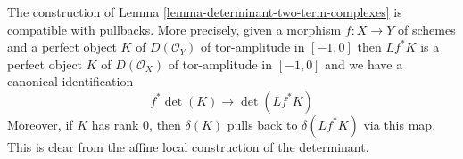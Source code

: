 \begin{remark}
\label{remark-functorial-det}
The construction of Lemma \ref{lemma-determinant-two-term-complexes}
is compatible with pullbacks. More precisely, given a morphism
$f : X \to Y$ of schemes and a perfect object $K$ of $D(\mathcal{O}_Y)$
of tor-amplitude in $[-1, 0]$ then $Lf^*K$ is a
perfect object $K$ of $D(\mathcal{O}_X)$
of tor-amplitude in $[-1, 0]$ and we have a canonical identification
$$
f^*\det(K) \longrightarrow \det(Lf^*K)
$$
Moreover, if $K$ has rank $0$, then $\delta(K)$ pulls back to
$\delta(Lf^*K)$ via this map. This is clear from the affine local
construction of the determinant.
\end{remark}





















